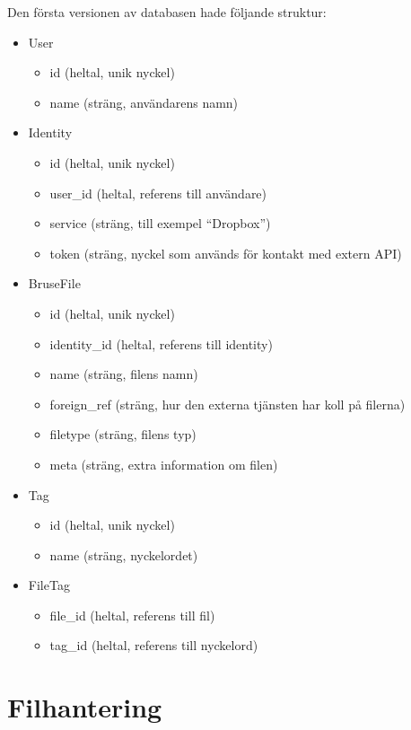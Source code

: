 Den första versionen av databasen hade följande struktur:
\begin{itemize}
\item User
  \begin{itemize}
    \item id (heltal, unik nyckel)
    \item name (sträng, användarens namn)
  \end{itemize}
\item Identity
  \begin{itemize}
    \item id (heltal, unik nyckel)
    \item user\_id (heltal, referens till användare)
    \item service (sträng, till exempel “Dropbox”)
    \item token (sträng, nyckel som används för kontakt med extern API)
  \end{itemize}
\item BruseFile
  \begin{itemize}
    \item id (heltal, unik nyckel)
    \item identity\_id (heltal, referens till identity)
    \item name (sträng, filens namn)
    \item foreign\_ref (sträng, hur den externa tjänsten har koll på filerna)
    \item filetype (sträng, filens typ)
    \item meta (sträng, extra information om filen)
  \end{itemize}
\item Tag
  \begin{itemize}
    \item id (heltal, unik nyckel)
    \item name (sträng, nyckelordet)
  \end{itemize}
\item FileTag
  \begin{itemize}
    \item file\_id (heltal, referens till fil)
    \item tag\_id (heltal, referens till nyckelord)
  \end{itemize}
\end{itemize}

\section{Filhantering}

